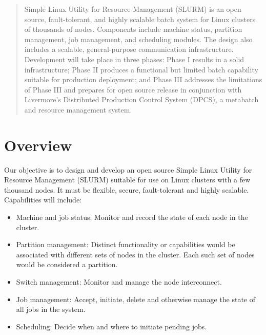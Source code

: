\maketitle

\begin{abstract}
Simple Linux Utility for Resource Management (SLURM) is an open source,
fault-tolerant, and highly scalable batch system for Linux clusters of 
thousands of nodes.  Components include machine status, partition
management, job management, and scheduling modules.  The design also 
includes a scalable, general-purpose communication infrastructure.
Development will take place in three phases:  Phase I results in a solid
infrastructure;  Phase II produces a functional but limited batch capability
suitable for production deployment; and Phase III addresses the limitations
of Phase III and prepares for open source release in conjunction with 
Livermore's Distributed Production Control System (DPCS), a metabatch and
resource management system.
\end{abstract}

\vspace{0.25in}

\begin{center}
\end{center}

\newpage



\section{Overview}

Our objective is to design and develop an open source Simple Linux Utility for
Resource Management (SLURM) suitable for use on Linux clusters with a few
thousand nodes.  It must be flexible, secure, fault-tolerant and highly
scalable.  Capabilities will include: 

\begin{itemize}
\item Machine and job status: Monitor and record the state of each node in the
cluster. 
\item Partition management: Distinct functionality or capabilities would be
associated with different sets of nodes in the cluster. Each such set of nodes
would be considered a partition. 
\item Switch management: Monitor and manage the node interconnect.
\item Job management: Accept, initiate, delete and otherwise manage the state of
all jobs in the system.
\item Scheduling: Decide when and where to initiate pending jobs.
\end{itemize}


